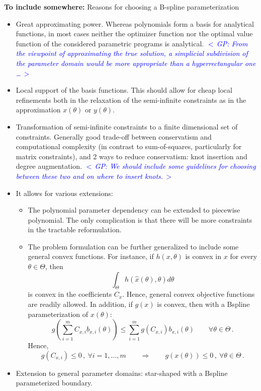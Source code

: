\documentclass{article}
\newcommand{\ppar}{\theta}                  %
\newcommand{\Ppar}{\Theta}                  %
\newcommand{\commentGP}[1]{\noindent \textcolor{blue}{\emph{$<\,$GP: #1$\,>$}}}%
\begin{document}
\vspace*{12pt}
\noindent\textbf{To include somewhere:} Reasons for choosing a B-spline parameterization
\begin{itemize}
\item Great approximating power. Whereas polynomials form a basis for analytical functions, in most cases neither the optimizer function nor the optimal value function of the considered parametric programs is analytical. \commentGP{From the viewpoint of approximating the true solution, a simplicial subdivision of the parameter domain would be more appropriate than a hyperrectangular one \ldots}
\item Local support of the basis functions. This should allow for cheap local refinements both in the relaxation of the semi-infinite constraints as in the approximation $x(\ppar)$ or $y(\ppar)$.   
\item Transformation of semi-infinite constraints to a finite dimensional set of constraints. Generally good trade-off between conservatism and computational complexity (in contrast to sum-of-squares, particularly for matrix constraints), and 2 ways to reduce conservatism: knot insertion and degree augmentation. \commentGP{We should include some guidelines for choosing between these two and on where to insert knots.}
\item It allows for various extensions:
    \begin{itemize}
    \item The polynomial parameter dependency can be extended to piecewise polynomial. The only complication is that there will be more constraints in the tractable reformulation.
    \item The problem formulation can be further generalized to include some general convex functions. For instance, if $h(x,\ppar)$ is convex in $x$ for every $\ppar\in\Ppar$, then
        \[ \int_{\Ppar} h(\hat{x}(\ppar), \ppar) d\ppar
        \]
        is convex in the coefficients $C_x$. Hence, general convex objective functions are readily allowed. In addition, if $g(x)$ is convex, then with a Bspline parameterization of $x(\ppar)$:
        \[ g\left(\sum_{i=1}^m C_{x,i} b_{x,i}(\ppar)\right) \leq \sum_{i=1}^m g(C_{x,i}) b_{x,i}(\ppar) \qquad \forall \ppar\in\Ppar\,. %
        \]
        Hence,
        \[ g(C_{x,i})\leq 0\,,~\forall i=1,\ldots,m \qquad \Rightarrow \qquad g(x(\ppar))\leq0\,,~\forall \ppar\in\Ppar\,.%
        \]
        \end{itemize}
    \item Extension to general parameter domains: star-shaped with a Bspline parameterized boundary.
\end{itemize}
\end{document}
